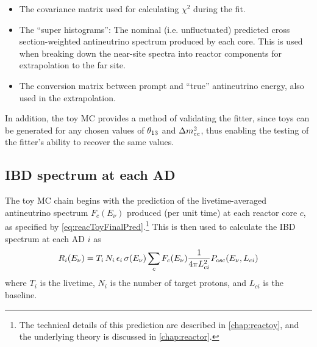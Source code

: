 \documentclass[../thesis.tex]{subfiles}
\begin{document}
\begin{itemize}
\item The covariance matrix used for calculating $\chi^2$ during the fit.
\item The ``super histograms'': The nominal (i.e. unfluctuated) predicted cross section-weighted antineutrino spectrum produced by each core. This is used when breaking down the near-site spectra into reactor components for extrapolation to the far site.
\item The conversion matrix between prompt and ``true'' antineutrino energy, also used in the extrapolation.
\end{itemize}

In addition, the toy MC provides a method of validating the fitter, since toys can be generated for any chosen values of $\theta_{13}$ and $\Delta m^2_{ee}$, thus enabling the testing of the fitter's ability to recover the same values.

\begin{comment}
  The toy MC also generates a ``PredictedIBD'' file which contains the bac
  kground-free no-oscillation IBD spectra of each detector. As far as I can tell, this is only used in order to calculate a `summed' covariance matrix in which the matrices of the three stages (6, 8, 7AD) are combined, with the weighting determined by the PredictedIBD counts. (Oscillations shouldn't affect this weighting between ADs in the same hall, or the weighting between different stages.) In turn, the summed matrix is not used during the fit, but is only produced as a diagnostic. 
\end{comment}

\subsection{IBD spectrum at each AD}
\label{sec:fitToyFluxPred}

The toy MC chain begins with the prediction of the livetime-averaged antineutrino spectrum $F_c(E_\nu)$ produced (per unit time) at each reactor core $c$, as specified by \autoref{eq:reacToyFinalPred}.\footnote{The technical details of this prediction are described in \autoref{chap:reactoy}, and the underlying theory is discussed in \autoref{chap:reactor}.} This is then used to calculate the IBD spectrum at each AD $i$ as
\begin{equation}
  \label{eq:fitTrueIbdSpec}
  R_i(E_\nu) = T_i\,N_i\,\epsilon_i\,\sigma(E_\nu) \sum_c F_c(E_\nu) \frac{1}{4\pi L_{ci}^2}
  P_\mathrm{osc}(E_\nu, L_{ci})
\end{equation}
where $T_i$ is the livetime, $N_i$ is the number of target protons, and $L_{ci}$ is the baseline.
\end{document}
